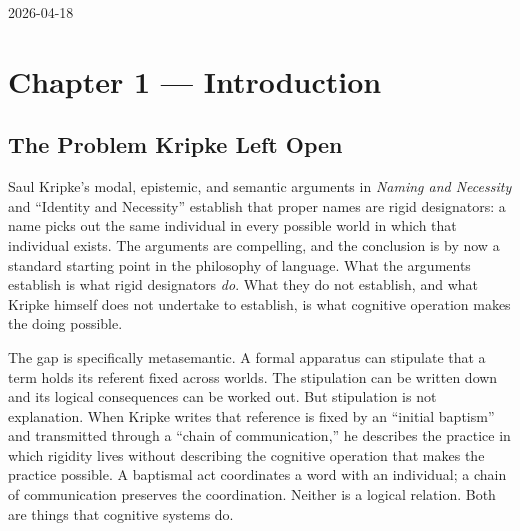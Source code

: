 \documentclass[10pt]{article}
\newlength{\notesmargin}
\begin{document}

\noindent\begin{minipage}{\dimexpr\textwidth+\notesmargin\relax}

  \hfill{\sffamily\normalsize 2026-04-18}

    \vspace{2pt}
  
  \vspace{4pt}
  \noindent{\color{ruleColor}\rule{\linewidth}{0.35pt}}

\end{minipage}

\vspace{3pt}

\section{Chapter 1 --- Introduction}\label{chapter-1-introduction}

\subsection{The Problem Kripke Left Open}\label{the-problem-kripke-left-open}

Saul Kripke's modal, epistemic, and semantic arguments in \emph{Naming and Necessity} and ``Identity and Necessity'' establish that proper names are rigid designators: a name picks out the same individual in every possible world in which that individual exists. The arguments are compelling, and the conclusion is by now a standard starting point in the philosophy of language. What the arguments establish is what rigid designators \emph{do}. What they do not establish, and what Kripke himself does not undertake to establish, is what cognitive operation makes the doing possible.

The gap is specifically metasemantic. A formal apparatus can stipulate that a term holds its referent fixed across worlds. The stipulation can be written down and its logical consequences can be worked out. But stipulation is not explanation. When Kripke writes that reference is fixed by an ``initial baptism'' and transmitted through a ``chain of communication,'' he describes the practice in which rigidity lives without describing the cognitive operation that makes the practice possible. A baptismal act coordinates a word with an individual; a chain of communication preserves the coordination. Neither is a logical relation. Both are things that cognitive systems do.
\end{document}
